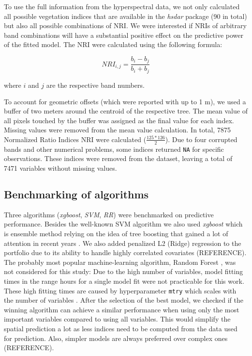 \documentclass[review]{elsarticle}
\begin{document}
To use the full information from the hyperspectral data, we not only calculated all possible vegetation indices that are available in the \textit{hsdar} package (90 in total) but also all possible combinations of \ac{NRI}.
We were interested if NRIs of arbitrary band combinations will have a substantial positive effect on the predictive power of the fitted model.
The NRI were calculated using the following formula:

\begin{equation}
	NRI_{i,j} = \frac{b_{i} - b_{j}}{b_{i} + b_{j}}
\end{equation}

\noindent
where $i$ and $j$ are the respective band numbers.

\bigbreak

To account for geometric offsets (which were reported with up to 1 m), we used a buffer of two meters around the centroid of the respective tree.
The mean value of all pixels touched by the buffer was assigned as the final value for each index.
Missing values were removed from the mean value calculation.
In total, 7875 Normalized Ratio Indices NRI were calculated ($\frac{125*126}{2}$).
Due to four corrupted bands and other numerical problems, some indices returned \texttt{NA} for specific observations.
These indices were removed from the dataset, leaving a total of 7471 variables without missing values.

\subsection{Benchmarking of algorithms}

Three algorithms (\textit{xgboost}, \textit{\ac{SVM}}, \textit{\ac{RR}}) were benchmarked on predictive performance.
Besides the well-known \ac{SVM} algorithm \citep{Vapnik1998} we also used \textit{xgboost} which is ensemble method relying on the idea of tree boosting that gained a lot of attention in recent years \citep{chenXGBoostScalableTree2016}.
We also added penalized L2 (Ridge) regression to the portfolio due to its ability to handle highly correlated covariates (REFERENCE).
The probably most popular machine-learning algorithm, Random Forest \citep{Breiman2001}, was not considered for this study: Due to the high number of variables, model fitting times in the range hours for a single model fit were not practicable for this work.
These high fitting times are caused by hyperparameter \texttt{mtry} which scales with the number of variables \citep{Probst2018b}.
After the selection of the best model, we checked if the winning algorithm can achieve a similar performance when using only the most important variables compared to using all variables.
This would simplify the spatial prediction a lot as less indices need to be computed from the data used for prediction.
Also, simpler models are always preferred over complex ones (REFERENCE).
\end{document}
